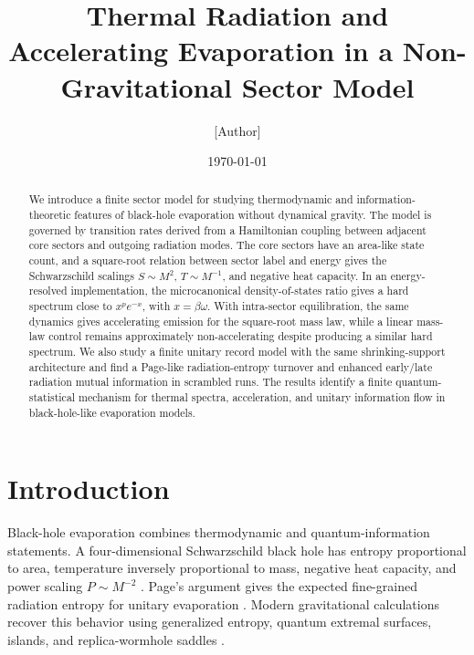 \documentclass[aps,prd,onecolumn,longbibliography,nofootinbib]{revtex4-2}
\begin{document}
\title{Thermal Radiation and Accelerating Evaporation in a Non-Gravitational Sector Model}

\author{[Author]}
\affiliation{[Affiliation]}
\date{\today}

\begin{abstract}
We introduce a finite sector model for studying thermodynamic and
information-theoretic features of black-hole evaporation without dynamical
gravity.  The model is governed by transition rates derived from a Hamiltonian
coupling between adjacent core sectors and outgoing radiation modes.  The core
sectors have an area-like state count, and a square-root relation between
sector label and energy gives the Schwarzschild scalings $S\sim M^2$,
$T\sim M^{-1}$, and negative heat capacity.  In an energy-resolved
implementation, the microcanonical density-of-states ratio gives a hard
spectrum close to $x^p e^{-x}$, with $x=\beta\omega$.  With intra-sector
equilibration, the same dynamics gives accelerating emission for the
square-root mass law, while a linear mass-law control remains approximately
non-accelerating despite producing a similar hard spectrum.  We also study a
finite unitary record model with the same shrinking-support architecture and
find a Page-like radiation-entropy turnover and enhanced early/late radiation
mutual information in scrambled runs.  The results identify a finite
quantum-statistical mechanism for thermal spectra, acceleration, and unitary
information flow in black-hole-like evaporation models.
\end{abstract}

\maketitle

\section{Introduction}

Black-hole evaporation combines thermodynamic and quantum-information
statements.  A four-dimensional Schwarzschild black hole has entropy
proportional to area, temperature inversely proportional to mass, negative heat
capacity, and power scaling $P\sim M^{-2}$ \cite{Bekenstein1973,Hawking1975}.
Page's argument gives the expected fine-grained radiation entropy for unitary
evaporation \cite{Page1993Info,Page1993Average}.  Modern gravitational
calculations recover this behavior using generalized entropy, quantum extremal
surfaces, islands, and replica-wormhole saddles
\cite{Penington2020,AEMM2019,AlmheiriReview2021}.
\end{document}
